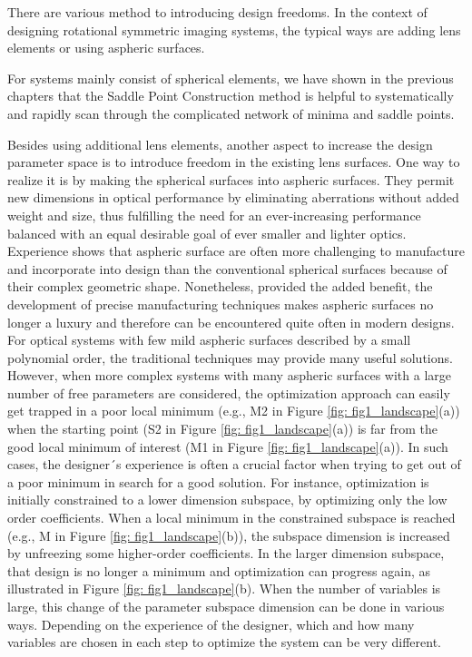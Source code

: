 There are various method to introducing design freedoms. In the context of designing rotational symmetric imaging systems, the typical ways are adding lens elements or using aspheric surfaces.  


For systems mainly consist of spherical elements, we have shown in the previous chapters that the Saddle Point Construction method is helpful to systematically and rapidly scan through the complicated network of minima and saddle points. 

Besides using additional lens elements, another aspect to increase the design parameter space is to introduce freedom in the existing lens surfaces. One way to realize it is by making the spherical surfaces into aspheric surfaces. They permit new dimensions in optical performance by eliminating aberrations without added weight and size, thus fulfilling the need for an ever-increasing performance balanced with an equal desirable goal of ever smaller and lighter optics. Experience shows that aspheric surface are often more challenging to manufacture and incorporate into design than the conventional spherical surfaces because of their complex geometric shape. Nonetheless, provided the added benefit, the development of precise manufacturing techniques makes aspheric surfaces no longer a luxury and therefore can be encountered quite often in modern designs. 
For optical systems with few mild aspheric surfaces described by a small polynomial order, the traditional techniques may provide many useful solutions. However, when more complex systems with many aspheric surfaces with a large number of free parameters are considered, the optimization approach can easily get trapped in a poor local minimum (e.g., M2 in Figure \ref{fig: fig1_landscape}(a)) when the starting point (S2 in Figure \ref{fig: fig1_landscape}(a)) is far from the good local minimum of interest (M1 in Figure \ref{fig: fig1_landscape}(a)). In such cases, the designer´s experience is often a crucial factor when trying to get out of a poor minimum in search for a good solution. For instance, optimization is initially constrained to a lower dimension subspace, by optimizing only the low order coefficients. When a local minimum in the constrained subspace is reached (e.g., M in Figure \ref{fig: fig1_landscape}(b)), the subspace dimension is increased by unfreezing some higher-order coefficients. In the larger dimension subspace, that design is no longer a minimum and optimization can progress again, as illustrated in Figure \ref{fig: fig1_landscape}(b). When the number of variables is large, this change of the parameter subspace dimension can be done in various ways. Depending on the experience of the designer, which and how many variables are chosen in each step to optimize the system can be very different. 
